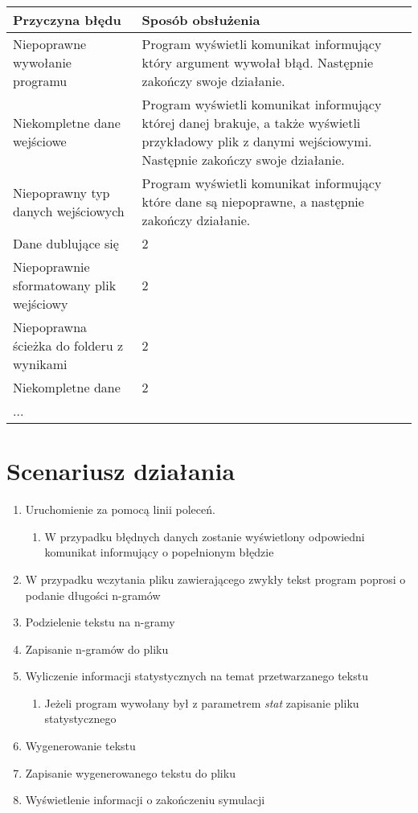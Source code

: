 \documentclass[a4paper,11pt,notitlepage]{article}
\begin{document}
\vspace{0.1in}
\begin{tabular}{ll}

Przyczyna błędu& Sposób obsłużenia\\
\hline
Niepoprawne wywołanie programu & Program wyświetli komunikat informujący który argument wywołał błąd. Następnie zakończy swoje działanie.\\
Niekompletne dane wejściowe & Program wyświetli komunikat informujący której danej brakuje, a także wyświetli przykładowy plik z danymi wejściowymi. Następnie zakończy swoje działanie.\\
Niepoprawny typ danych wejściowych & Program wyświetli komunikat informujący które dane są niepoprawne, a następnie zakończy działanie.\\
Dane dublujące się & 2\\
Niepoprawnie sformatowany plik wejściowy & 2\\
Niepoprawna ścieżka do folderu z wynikami & 2\\
Niekompletne dane & 2\\
...\\
\end{tabular}


\section{Scenariusz działania}

\begin{enumerate}[noitemsep]
	\item Uruchomienie za pomocą linii poleceń.
	\begin{enumerate}
		\item W przypadku błędnych danych zostanie wyświetlony odpowiedni komunikat informujący o popełnionym błędzie
	\end{enumerate}
	\item W przypadku wczytania pliku zawierającego zwykły tekst program poprosi o podanie długości n-gramów
	\item Podzielenie tekstu na n-gramy
	\item Zapisanie n-gramów do pliku
	\item Wyliczenie informacji statystycznych na temat przetwarzanego tekstu
	\begin{enumerate}
		\item Jeżeli program wywołany był z parametrem \emph{ stat } zapisanie pliku statystycznego
	\end{enumerate}
	\item Wygenerowanie tekstu
	\item Zapisanie wygenerowanego tekstu do pliku
	\item Wyświetlenie informacji o zakończeniu symulacji
\end{enumerate}
\end{document}
